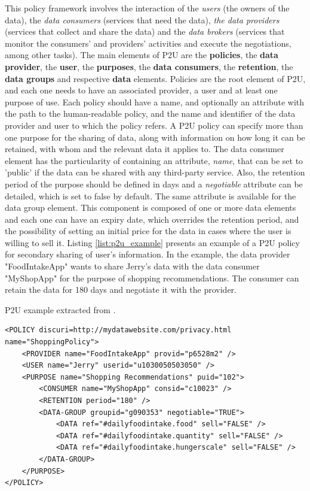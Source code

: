 This policy framework involves the interaction of the \textit{users} (the owners of the data), the \textit{data consumers} (services that need the data), \textit{the data providers} (services that collect and share the data) and the \textit{data brokers} (services that monitor the consumers' and providers' activities and execute the negotiations, among other tasks).
The main elements of P2U are the \textbf{policies}, the \textbf{data provider}, the \textbf{user}, the \textbf{purposes}, the \textbf{data consumers}, the \textbf{retention}, the \textbf{data groups} and respective \textbf{data} elements.
Policies are the root element of P2U, and each one needs to have an associated provider, a user and at least one purpose of use.
Each policy should have a name, and optionally an attribute with the path to the human-readable policy, and the name and identifier of the data provider and user to which the policy refers.
A P2U policy can specify more than one purpose for the sharing of data, along with information on how long it can be retained, with whom and the relevant data it applies to.
The data consumer element has the particularity of containing an attribute, \textit{name}, that can be set to 'public' if the data can be shared with any third-party service.
Also, the retention period of the purpose should be defined in days and a \textit{negotiable} attribute can be detailed, which is set to false by default.
The same attribute is available for the data group element.
This component is composed of one or more data elements and each one can have an expiry date, which overrides the retention period, and the possibility of setting an initial price for the data in cases where the user is willing to sell it.
Listing \ref{list:p2u_example} presents an example of a P2U policy for secondary sharing of user's information. In the example, the data provider "FoodIntakeApp" wants to share Jerry's data with the data consumer "MyShopApp" for the purpose of shopping recommendations. The consumer can retain the data for 180 days and negotiate it with the provider.

\begin{listing}
\caption{P2U example extracted from \cite{iyilade_p2u_2014}.}
\label{list:p2u_example}
\begin{verbatim}
<POLICY discuri=http://mydatawebsite.com/privacy.html name="ShoppingPolicy">
    <PROVIDER name="FoodIntakeApp" provid="p6528m2" />
    <USER name="Jerry" userid="u1030050503050" />
    <PURPOSE name="Shopping Recommendations" puid="102">
        <CONSUMER name="MyShopApp" consid="c10023" />
        <RETENTION period="180" />
        <DATA-GROUP groupid="g090353" negotiable="TRUE">
            <DATA ref="#dailyfoodintake.food" sell="FALSE" />
            <DATA ref="#dailyfoodintake.quantity" sell="FALSE" />
            <DATA ref="#dailyfoodintake.hungerscale" sell="FALSE" />
        </DATA-GROUP>
    </PURPOSE>
</POLICY>
\end{verbatim}
\end{listing}

